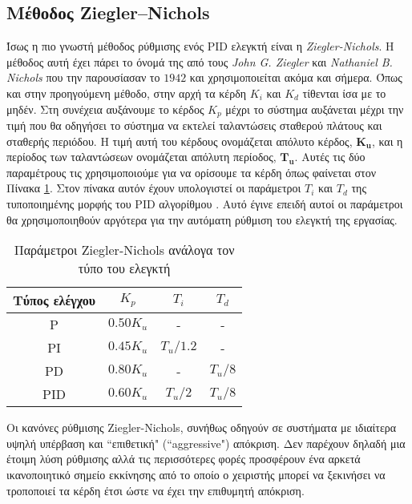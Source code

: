 \subsection{Μέθοδος Ziegler–Nichols}

Ίσως η πιο γνωστή μέθοδος ρύθμισης ενός PID ελεγκτή είναι η \emph{Ziegler-Nichols}. Η μέθοδος αυτή έχει πάρει το όνομά της από τους \emph{John G. Ziegler} και \emph{Nathaniel B. Nichols} που την παρουσίασαν το $1942$ και χρησιμοποιείται ακόμα και σήμερα. Όπως και στην προηγούμενη μέθοδο, στην αρχή τα κέρδη $K_i$ και $K_d$ τίθενται ίσα με το μηδέν. Στη συνέχεια αυξάνουμε το κέρδος $K_p$ μέχρι το σύστημα αυξάνεται μέχρι την τιμή που θα οδηγήσει το σύστημα να εκτελεί ταλαντώσεις σταθερού πλάτους και σταθερής περιόδου. Η τιμή αυτή του κέρδους ονομάζεται απόλυτο κέρδος, $\boldsymbol{K_u}$, και η περίοδος των ταλαντώσεων ονομάζεται απόλυτη περίοδος, $\boldsymbol{T_u}$. Αυτές τις δύο παραμέτρους τις χρησιμοποιούμε για να ορίσουμε τα κέρδη όπως φαίνεται στον Πίνακα \ref{table:zn_method}. Στον πίνακα αυτόν έχουν υπολογιστεί οι παράμετροι $T_i$ και $T_d$ της τυποποιημένης μορφής του PID αλγορίθμου \cite{ziegler-nichols}. Αυτό έγινε επειδή αυτοί οι παράμετροι θα χρησιμοποιηθούν αργότερα για την αυτόματη ρύθμιση του ελεγκτή της εργασίας.


\begin{table}[H]
 \begin{center}
 \begin{tabular}{|c|c|c|c|}
 \hline
 Τύπος ελέγχου & $K_p$ & $T_i$ & $T_d$ \\ \hline
 P & $0.50K_u$ & - & - \\ \hline
 PI & $0.45K_u$ & $T_u/1.2$ & - \\ \hline
 PD & $0.80K_u$ & - & $T_u/8$ \\ \hline
 PID & $0.60K_u$ & $T_u/2$ & $T_u/8$ \\ \hline
 \end{tabular}
 \caption{Παράμετροι Ziegler-Nichols ανάλογα τον τύπο του ελεγκτή}
 \label{table:zn_method}
 \end{center}
\end{table}

Οι κανόνες ρύθμισης Ziegler-Nichols, συνήθως οδηγούν σε συστήματα με ιδιαίτερα υψηλή υπέρβαση και ``επιθετική" (``aggressive") απόκριση. Δεν παρέχουν δηλαδή μια έτοιμη λύση ρύθμισης αλλά τις περισσότερες φορές προσφέρουν ένα αρκετά ικανοποιητικό σημείο εκκίνησης από το οποίο ο χειριστής μπορεί να ξεκινήσει να τροποποιεί τα κέρδη έτσι ώστε να έχει την επιθυμητή απόκριση.




